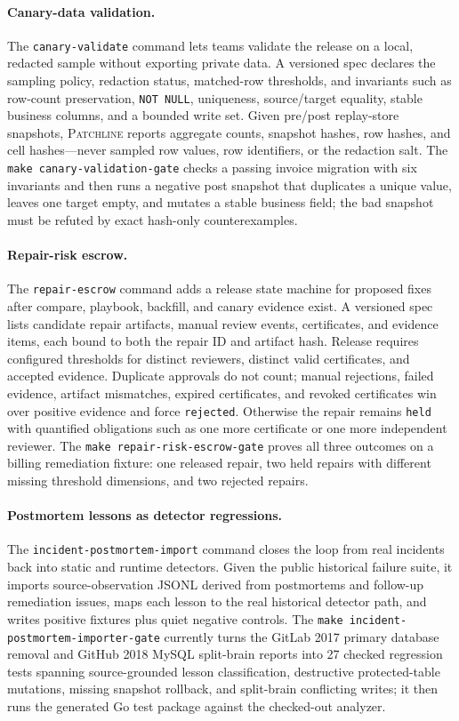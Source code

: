 \documentclass[11pt]{article}
\newcommand{\tool}{\textsc{Patchline}}
\newcommand{\code}[1]{\texttt{#1}}
\newcommand{\gate}[1]{\texttt{make #1}}
\begin{document}
\paragraph{Canary-data validation.} The \code{canary-validate} command lets teams validate the
release on a local, redacted sample without exporting private data. A versioned spec declares the
sampling policy, redaction status, matched-row thresholds, and invariants such as row-count
preservation, \code{NOT NULL}, uniqueness, source/target equality, stable business columns, and a
bounded write set. Given pre/post replay-store snapshots, \tool{} reports aggregate counts, snapshot
hashes, row hashes, and cell hashes---never sampled row values, row identifiers, or the redaction salt.
The \gate{canary-validation-gate} checks a passing invoice migration with six invariants and then runs
a negative post snapshot that duplicates a unique value, leaves one target empty, and mutates a stable
business field; the bad snapshot must be refuted by exact hash-only counterexamples.

\paragraph{Repair-risk escrow.} The \code{repair-escrow} command adds a release state machine for
proposed fixes after compare, playbook, backfill, and canary evidence exist. A versioned spec lists
candidate repair artifacts, manual review events, certificates, and evidence items, each bound to both
the repair ID and artifact hash. Release requires configured thresholds for distinct reviewers,
distinct valid certificates, and accepted evidence. Duplicate approvals do not count; manual
rejections, failed evidence, artifact mismatches, expired certificates, and revoked certificates win
over positive evidence and force \code{rejected}. Otherwise the repair remains \code{held} with
quantified obligations such as one more certificate or one more independent reviewer. The
\gate{repair-risk-escrow-gate} proves all three outcomes on a billing remediation fixture: one released
repair, two held repairs with different missing threshold dimensions, and two rejected repairs.

\paragraph{Postmortem lessons as detector regressions.} The \code{incident-postmortem-import} command
closes the loop from real incidents back into static and runtime detectors. Given the public historical
failure suite, it imports source-observation JSONL derived from postmortems and follow-up remediation
issues, maps each lesson to the real historical detector path, and writes positive fixtures plus quiet
negative controls. The \gate{incident-postmortem-importer-gate} currently turns the GitLab 2017 primary
database removal and GitHub 2018 MySQL split-brain reports into 27 checked regression tests spanning
source-grounded lesson classification, destructive protected-table mutations, missing snapshot rollback,
and split-brain conflicting writes; it then runs the generated Go test package against the checked-out
analyzer.
\end{document}
